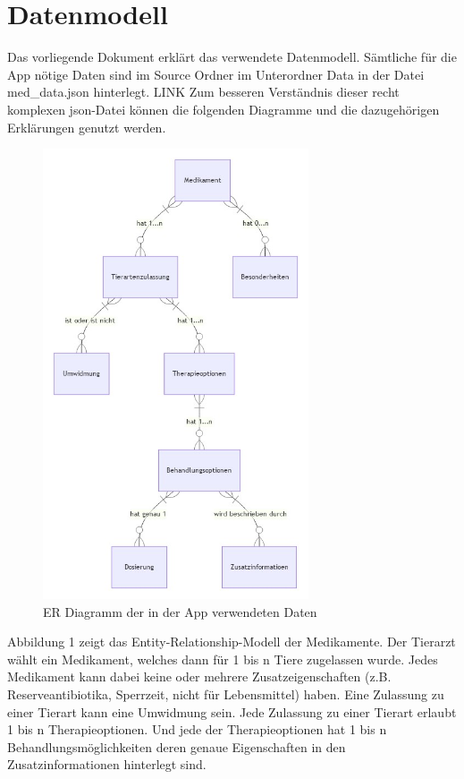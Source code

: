 \documentclass[a4paper]{article}
\begin{document}
\section{Datenmodell}
Das vorliegende Dokument erklärt das verwendete Datenmodell. Sämtliche für die App nötige Daten sind im Source Ordner im Unterordner Data in der Datei med\_data.json 
hinterlegt. LINK Zum besseren Verständnis dieser recht komplexen json-Datei können die folgenden Diagramme und die dazugehörigen Erklärungen genutzt werden.


    \begin{figure}[h]
        \centering
        \includegraphics[width=0.7\textwidth]{er_diagramm}
        \caption{ER Diagramm der in der App verwendeten Daten}
    \end{figure}

Abbildung 1 zeigt das Entity-Relationship-Modell der Medikamente. Der Tierarzt wählt ein Medikament, welches dann für 1 bis n Tiere zugelassen wurde. Jedes Medikament 
kann dabei keine oder mehrere Zusatzeigenschaften (z.B. Reserveantibiotika, Sperrzeit, nicht für Lebensmittel) haben. Eine Zulassung zu einer Tierart kann eine Umwidmung sein.
Jede Zulassung zu einer Tierart erlaubt 1 bis n Therapieoptionen. Und jede der Therapieoptionen hat 1 bis n Behandlungsmöglichkeiten deren genaue Eigenschaften in den Zusatzinformationen
hinterlegt sind.
\end{document}
